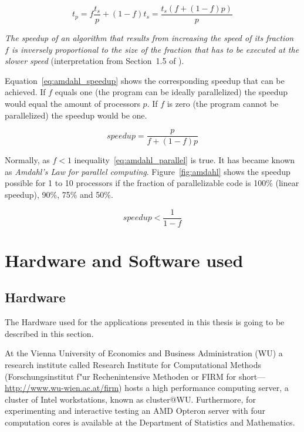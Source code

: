 \begin{equation}
\label{eq:t_amdahl}
t_p = f \frac{t_s}{p} + (1 - f) t_s = \frac{t_s ( f + ( 1 - f) p )}{p}
\end{equation}

\textit{The speedup of an algorithm that results from increasing the speed of
its fraction $f$ is inversely proportional to the size of the fraction
that has to be executed at the slower speed} (interpretation from
Section~1.5 of \cite{kontoghiorghes06handbookpcstat}).

Equation~\ref{eq:amdahl_speedup} shows the corresponding speedup that
can be achieved. If $f$ equals one (the program can be ideally
parallelized) the speedup would equal the amount of processors $p$. If
$f$ is zero (the program cannot be parallelized) the speedup would be
one. 

\begin{equation}
\label{eq:amdahl_speedup}
speedup = \frac{p}{f + (1 - f)p}
\end{equation}

Normally, as $f < 1$ inequality~\ref{eq:amdahl_parallel} is true. It
has became known as \textit{Amdahl's Law for parallel
  computing}. Figure~\ref{fig:amdahl} shows the speedup possible for 1
to 10 processors if
the fraction of parallelizable code is 100\% (linear speedup), 90\%,
75\% and 50\%.

\begin{equation}
\label{eq:amdahl_parallel}
speedup < \frac{1}{1 - f}
\end{equation}





\section{Hardware and Software used}
\label{sec:hardwaresoftware}

\subsection{Hardware}
The Hardware used for the applications presented in this thesis is
going to be described in this section.

At the Vienna University of Economics and Business Administration (WU)
a research institute called Research Institute for Computational
Methods (Forschungsinstitut f"ur Rechenintensive Methoden or FIRM for
short---\url{http://www.wu-wien.ac.at/firm}) hosts a high
performance computing server, a cluster of Intel workstations, known
as cluster@WU.
Furthermore, for experimenting and interactive testing an AMD Opteron
server with four computation cores is available at the
Department of Statistics and Mathematics. 

